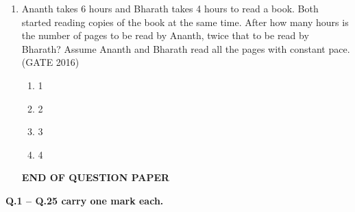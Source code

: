 \documentclass[journal,12pt,onecolumn]{IEEEtran}
\theoremstyle{remark}
\begin{document}
\begin{enumerate}
\item Ananth takes 6 hours and Bharath takes 4 hours to read a book. Both started reading copies of the book at the same time. After how many hours is the number of pages to be read by Ananth, twice that to be read by Bharath? Assume Ananth and Bharath read all the pages with constant pace.  
\hfill{(GATE 2016)}

\begin{enumerate}
    \item 1
    \item 2
    \item 3
    \item 4
\end{enumerate}
\vspace{10cm}
\begin{center}
 \textbf{\Large END OF QUESTION PAPER}   
\end{center}
\newpage



\end{enumerate}


\begin{center}
    {\Large \textbf{Q.1 -- Q.25 carry one mark each.}}
\end{center}
\end{document}
